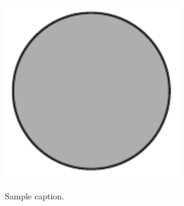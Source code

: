 \begin{figure}[h]
  \centering
  \includegraphics[width=3in]{fig02a-circle}\\
  \caption{Sample caption.}\label{label}
\end{figure} 

